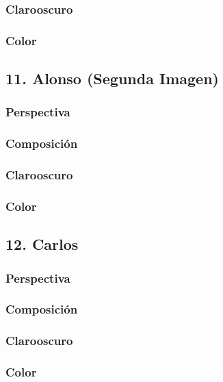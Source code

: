 \documentclass[12pt]{article}
\begin{document}
        \subsubsection{Clarooscuro}
    
        \subsubsection{Color}
    \subsection{11. Alonso (Segunda Imagen)}
        \subsubsection{Perspectiva}
    
        \subsubsection{Composición}
    
        \subsubsection{Clarooscuro}
    
        \subsubsection{Color}
    \subsection{12. Carlos}
        \subsubsection{Perspectiva}
    
        \subsubsection{Composición}
    
        \subsubsection{Clarooscuro}
    
        \subsubsection{Color}
\end{document}
